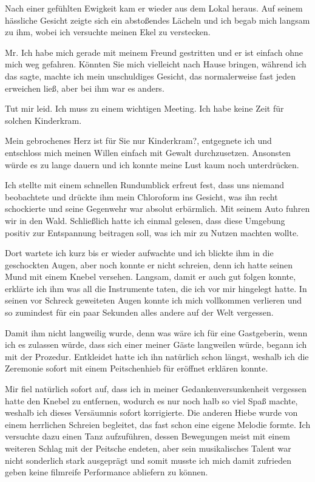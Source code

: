 \documentclass[11pt, a5paper]{article}
\begin{document}
\begin{spacing}{1.2}
		Nach einer gefühlten Ewigkeit kam er wieder aus dem Lokal heraus. Auf seinem hässliche Gesicht zeigte sich ein abstoßendes Lächeln und ich begab mich langsam zu ihm, wobei ich versuchte meinen Ekel zu verstecken.
		
		\frqq Mr. Ich habe mich gerade mit meinem Freund gestritten und er ist einfach ohne mich weg gefahren. Könnten Sie mich vielleicht nach Hause bringen\flqq , während ich das sagte, machte ich mein unschuldiges Gesicht, das normalerweise fast jeden erweichen ließ, aber bei ihm war es anders.
		
		\frqq Tut mir leid. Ich muss zu einem wichtigen Meeting. Ich habe keine Zeit für solchen Kinderkram.\flqq
		
		\frqq Mein gebrochenes Herz ist für Sie nur Kinderkram?\flqq , entgegnete ich und entschloss mich meinen Willen einfach mit Gewalt durchzusetzen. Ansonsten würde es zu lange dauern und ich konnte meine Lust kaum noch unterdrücken.
		
		Ich stellte mit einem schnellen Rundumblick erfreut fest, dass uns niemand beobachtete und drückte ihm mein Chloroform ins Gesicht, was ihn recht schockierte und seine Gegenwehr war absolut erbärmlich. Mit seinem Auto fuhren wir in den Wald. Schließlich hatte ich einmal gelesen, dass diese Umgebung positiv zur Entspannung beitragen soll, was ich mir zu Nutzen machten wollte.
		
		Dort wartete ich kurz bis er wieder aufwachte und ich blickte ihm in die geschockten Augen, aber noch konnte er nicht schreien, denn ich hatte seinen Mund mit einem Knebel versehen. Langsam, damit er auch gut folgen konnte, erklärte ich ihm was all die Instrumente taten, die ich vor mir hingelegt hatte. In seinen vor Schreck geweiteten Augen konnte ich mich vollkommen verlieren und so zumindest für ein paar Sekunden alles andere auf der Welt vergessen.
		
		Damit ihm nicht langweilig wurde, denn was wäre ich für eine Gastgeberin, wenn ich es zulassen würde, dass sich einer meiner Gäste langweilen würde, begann ich mit der Prozedur. Entkleidet hatte ich ihn natürlich schon längst, weshalb ich die Zeremonie sofort mit einem Peitschenhieb für eröffnet erklären konnte.
		
		Mir fiel natürlich sofort auf, dass ich in meiner Gedankenversunkenheit vergessen hatte den Knebel zu entfernen, wodurch es nur noch halb so viel Spaß machte, weshalb ich dieses Versäumnis sofort korrigierte. Die anderen Hiebe wurde von einem herrlichen Schreien begleitet, das fast schon eine eigene Melodie formte. Ich versuchte dazu einen Tanz aufzuführen, dessen Bewegungen meist mit einem weiteren Schlag mit der Peitsche endeten, aber sein musikalisches Talent war nicht sonderlich stark ausgeprägt und somit musste ich mich damit zufrieden geben keine filmreife Performance abliefern zu können.
		

\end{spacing}
\end{document}
